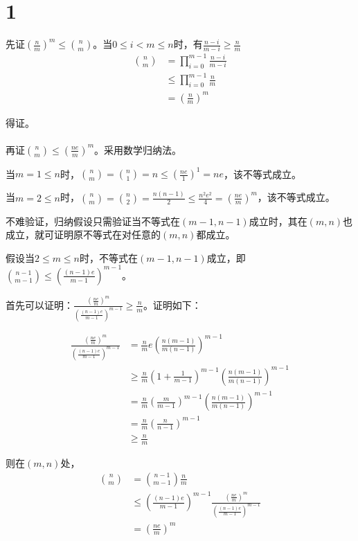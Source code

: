 \documentclass{article}
\date{\today}
\begin{document}
\makecover

\section*{1}
先证$(\frac{n}{m})^m\leq \binom{n}{m}$。当$0\leq i < m\leq n$时，有$\frac{n-i}{m-i}\geq\frac{n}{m}$
\begin{equation*}
\begin{split}
\binom{n}{m}&=\prod_{i=0}^{m-1}\frac{n-i}{m-i}\\
&\leq\prod_{i=0}^{m-1}\frac{n}{m}\\
&=(\frac{n}{m})^m
\end{split}
\end{equation*}

得证。
\\\\

再证$\binom{n}{m}\leq (\frac{ne}{m})^m$。采用数学归纳法。

当$m=1\leq n$时，$\binom{n}{m}=\binom{n}{1}=n \leq (\frac{ne}{1})^1=ne$，该不等式成立。

当$m=2\leq n$时，$\binom{n}{m}=\binom{n}{2}=\frac{n(n-1)}{2} \leq \frac{n^2e^2}{4} = (\frac{ne}{m})^m$，该不等式成立。

不难验证，归纳假设只需验证当不等式在$(m-1,n-1)$成立时，其在$(m,n)$也成立，就可证明原不等式在对任意的$(m,n)$都成立。

假设当$2\leq m \leq n$时，不等式在$(m-1,n-1)$成立，即$\binom{n-1}{m-1}\leq (\frac{(n-1)e}{m-1})^{m-1}$。

首先可以证明：$\frac{(\frac{ne}{m})^m}{(\frac{(n-1)e}{m-1})^{m-1}}\geq \frac{n}{m}$。证明如下：

\begin{equation*}
\begin{split}
\frac{(\frac{ne}{m})^m}{(\frac{(n-1)e}{m-1})^{m-1}}&=\frac{n}{m}e(\frac{n(m-1)}{m(n-1)})^{m-1}\\
&\geq \frac{n}{m}(1+\frac{1}{m-1})^{m-1}(\frac{n(m-1)}{m(n-1)})^{m-1}\\
&=\frac{n}{m}(\frac{m}{m-1})^{m-1}(\frac{n(m-1)}{m(n-1)})^{m-1}\\
&=\frac{n}{m}(\frac{n}{n-1})^{m-1}\\
&\geq \frac{n}{m}
\end{split}
\end{equation*}

则在$(m,n)$处，
\begin{equation*}
\begin{split}
\binom{n}{m}&=\binom{n-1}{m-1}\frac{n}{m}\\
&\leq (\frac{(n-1)e}{m-1})^{m-1}\frac{(\frac{ne}{m})^m}{(\frac{(n-1)e}{m-1})^{m-1}}\\
&= (\frac{ne}{m})^m
\end{split}
\end{equation*}
\end{document}
